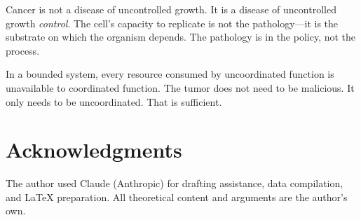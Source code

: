 \documentclass[11pt]{article}
\theoremstyle{definition}
\begin{document}
Cancer is not a disease of uncontrolled growth. It is a disease of
uncontrolled growth \emph{control}. The cell's capacity to replicate
is not the pathology---it is the substrate on which the organism
depends. The pathology is in the policy, not the process.

In a bounded system, every resource consumed by uncoordinated function
is unavailable to coordinated function. The tumor does not need to be
malicious. It only needs to be uncoordinated. That is sufficient.

\section*{Acknowledgments}

The author used Claude (Anthropic) for drafting assistance, data
compilation, and \LaTeX{} preparation. All theoretical content and
arguments are the author's own.
\end{document}
